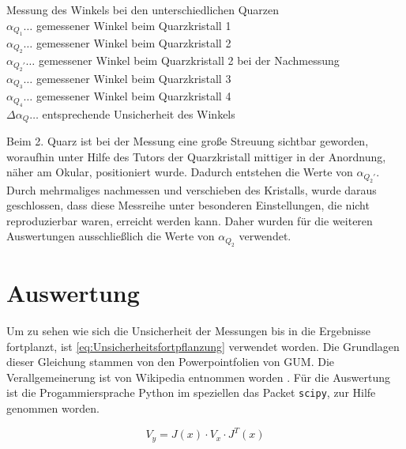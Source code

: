 \documentclass[11pt,ngerman]{scrartcl}
\begin{document}
\begin{table}[H]
	\caption{Messung des Winkels bei den unterschiedlichen Quarzen \\
		$\alpha_{Q_1} \dots$ gemessener Winkel beim Quarzkristall 1\\ $\alpha_{Q_2}
			\dots$ gemessener Winkel beim Quarzkristall 2\\ $\alpha_{Q_2'} \dots$
		gemessener Winkel beim Quarzkristall 2 bei der Nachmessung \\ $\alpha_{Q_3}
			\dots$ gemessener Winkel beim Quarzkristall 3\\ $\alpha_{Q_4} \dots$ gemessener
		Winkel beim Quarzkristall 4\\ $\Delta \alpha_Q \dots$ entsprechende Unsicherheit des
		Winkels}
	\label{tab:quarzwinkel}
	\centering
	
\end{table}


Beim 2. Quarz ist bei der Messung eine große Streuung sichtbar geworden,
woraufhin unter Hilfe des Tutors der Quarzkristall mittiger in der Anordnung,
näher am Okular, positioniert wurde. Dadurch entstehen die Werte von
$\alpha_{Q_2'}$. Durch mehrmaliges nachmessen und verschieben des Kristalls,
wurde daraus geschlossen, dass diese Messreihe unter besonderen Einstellungen,
die nicht reproduzierbar waren, erreicht werden kann. Daher wurden für die
weiteren Auswertungen ausschließlich die Werte von $\alpha_{Q_2}$ verwendet.

\newpage

\section{Auswertung}

\noindent Um zu sehen wie sich die Unsicherheit der Messungen bis in die Ergebnisse
fortplanzt, ist \autoref{eq:Unsicherheitsfortpflanzung} verwendet worden.
Die Grundlagen dieser Gleichung stammen von den Powerpointfolien von
GUM.\cite{WolfgangKessel2004} Die Verallgemeinerung ist von Wikipedia entnommen
worden \cite{2020Fehler}.
Für die Auswertung ist die Progammiersprache Python im speziellen das
Packet \verb#scipy#, zur Hilfe genommen worden.

\begin{equation}
	\label{eq:Unsicherheitsfortpflanzung}
	V_y = J(x) \cdot V_x \cdot J^{T}(x)
\end{equation}
\end{document}
